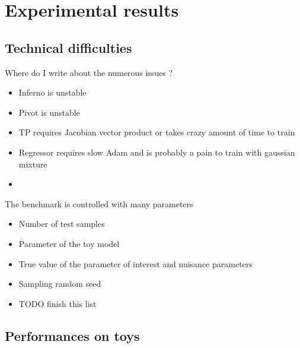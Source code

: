 
\chapter{Experimental results}
\label{chap:xp}
\ifpdf
    \graphicspath{{Chapter5/Figs/Raster/}{Chapter5/Figs/PDF/}{Chapter5/Figs/}}
\else
    \graphicspath{{Chapter5/Figs/Vector/}{Chapter5/Figs/}}
\fi




\section{Technical difficulties} %
\label{sec:technical_difficulties}

Where do I write about the numerous issues ?
\begin{itemize}
  \item Inferno is unstable
  \item Pivot is unstable
  \item TP requires Jacobian vector product or takes crazy amount of time to train
  \item Regressor requires slow Adam and is probably a pain to train with gaussian mixture
  \item 
\end{itemize}



The benchmark is controlled with many parameters
\begin{itemize}
  \item Number of test samples
  \item Parameter of the toy model
  \item True value of the parameter of interest and nuisance parameters
  \item Sampling random seed
  \item TODO finish this list
\end{itemize}








\section{Performances on toys} %
\label{sec:performances_on_toys}

